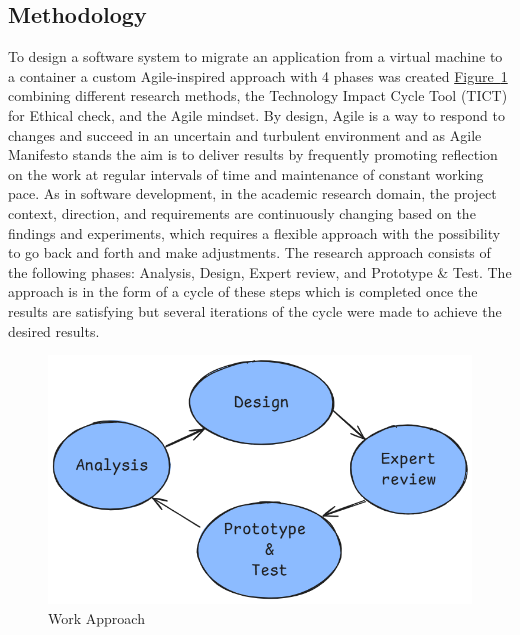\documentclass{article}
\newcommand{\FigRef}[1]{\hyperref[#1]{Figure~\ref{#1}}}
\begin{document}
\begin{multicols}{2}
\section{Methodology}
To design a software system to migrate an application from a virtual machine to a container a custom Agile-inspired approach with 4 phases was created \FigRef{fig:work_approach} combining different research methods, the Technology Impact Cycle Tool (TICT) for Ethical check, and the Agile mindset. By design, Agile is a way to respond to changes and succeed in an uncertain and turbulent environment and as Agile Manifesto stands \cite{BeckEtAl-2001} the aim is to deliver results by frequently promoting reflection on the work at regular intervals of time and maintenance of constant working pace. As in software development, in the academic research domain, the project context, direction, and requirements are continuously changing based on the findings and experiments, which requires a flexible approach with the possibility to go back and forth and make adjustments. The research approach consists of the following phases: Analysis, Design, Expert review, and Prototype \& Test. The approach is in the form of a cycle of these steps which is completed once the results are satisfying but several iterations of the cycle were made to achieve the desired results.

\begin{figure}[H]
    \centering
    \includegraphics[width=\linewidth]{images/approach.png}
    \caption{Work Approach}
    \label{fig:work_approach}
\end{figure}


\end{multicols}
\end{document}
